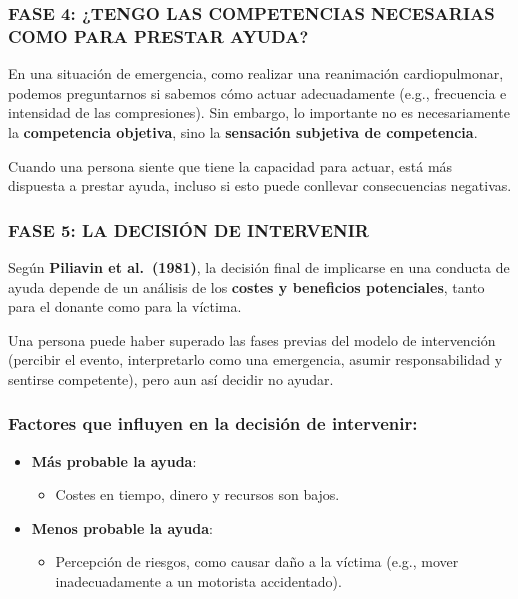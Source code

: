 \documentclass[
]{book}
\providecommand{\tightlist}{%
  \setlength{\itemsep}{0pt}\setlength{\parskip}{0pt}}
\begin{document}
\subsubsection{FASE 4: ¿TENGO LAS COMPETENCIAS NECESARIAS COMO PARA PRESTAR AYUDA?}\label{fase-4-tengo-las-competencias-necesarias-como-para-prestar-ayuda}

En una situación de emergencia, como realizar una reanimación cardiopulmonar, podemos preguntarnos si sabemos cómo actuar adecuadamente (e.g., frecuencia e intensidad de las compresiones). Sin embargo, lo importante no es necesariamente la \textbf{competencia objetiva}, sino la \textbf{sensación subjetiva de competencia}.

Cuando una persona siente que tiene la capacidad para actuar, está más dispuesta a prestar ayuda, incluso si esto puede conllevar consecuencias negativas.

\subsubsection{FASE 5: LA DECISIÓN DE INTERVENIR}\label{fase-5-la-decisiuxf3n-de-intervenir}

Según \textbf{Piliavin et al.~(1981)}, la decisión final de implicarse en una conducta de ayuda depende de un análisis de los \textbf{costes y beneficios potenciales}, tanto para el donante como para la víctima.

Una persona puede haber superado las fases previas del modelo de intervención (percibir el evento, interpretarlo como una emergencia, asumir responsabilidad y sentirse competente), pero aun así decidir no ayudar.

\subsubsection{Factores que influyen en la decisión de intervenir:}\label{factores-que-influyen-en-la-decisiuxf3n-de-intervenir}

\begin{itemize}
\tightlist
\item
  \textbf{Más probable la ayuda}:

  \begin{itemize}
  \tightlist
  \item
    Costes en tiempo, dinero y recursos son bajos.
  \end{itemize}
\item
  \textbf{Menos probable la ayuda}:

  \begin{itemize}
  \tightlist
  \item
    Percepción de riesgos, como causar daño a la víctima (e.g., mover inadecuadamente a un motorista accidentado).
  \end{itemize}
\end{itemize}
\end{document}
